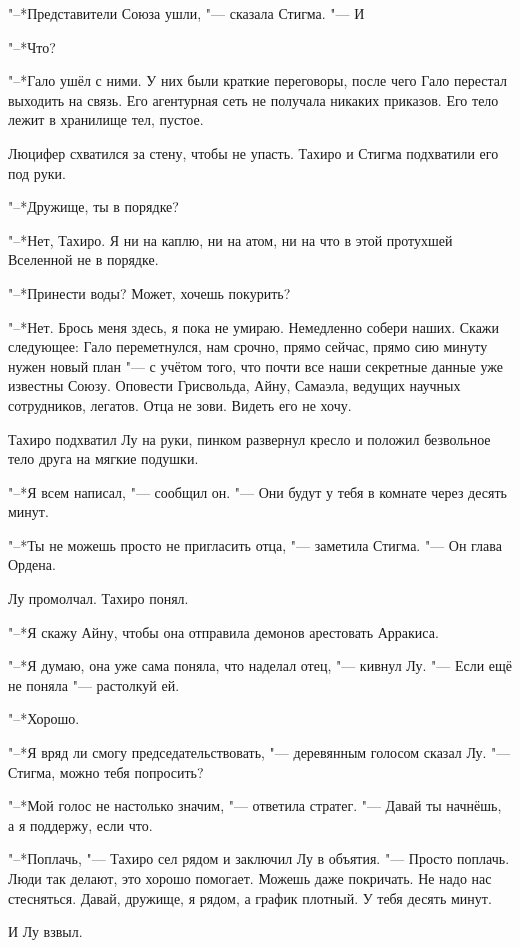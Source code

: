 \spacing

"--*Представители Союза ушли, "--- сказала Стигма.
"--- И\ldotst

"--*Что?

"--*Гало ушёл с ними.
У них были краткие переговоры, после чего Гало перестал выходить на связь.
Его агентурная сеть не получала никаких приказов.
Его тело лежит в хранилище тел, пустое.

Люцифер схватился за стену, чтобы не упасть.
Тахиро и Стигма подхватили его под руки.

"--*Дружище, ты в порядке?

"--*Нет, Тахиро.
Я ни на каплю, ни на атом, ни на что в этой протухшей Вселенной не в порядке.

"--*Принести воды?
Может, хочешь покурить?

"--*Нет.
Брось меня здесь, я пока не умираю.
Немедленно собери наших.
Скажи следующее: Гало переметнулся, нам срочно, прямо сейчас, прямо сию минуту нужен новый план "--- с учётом того, что почти все наши секретные данные уже известны Союзу.
Оповести Грисвольда, Айну, Самаэла, ведущих научных сотрудников, легатов.
Отца не зови.
Видеть его не хочу.

Тахиро подхватил Лу на руки, пинком развернул кресло и положил безвольное тело друга на мягкие подушки.

"--*Я всем написал, "--- сообщил он.
"--- Они будут у тебя в комнате через десять минут.

"--*Ты не можешь просто не пригласить отца, "--- заметила Стигма.
"--- Он глава Ордена.

Лу промолчал.
Тахиро понял.

"--*Я скажу Айну, чтобы она отправила демонов арестовать Арракиса.

"--*Я думаю, она уже сама поняла, что наделал отец, "--- кивнул Лу.
"--- Если ещё не поняла "--- растолкуй ей.

"--*Хорошо.

"--*Я вряд ли смогу председательствовать, "--- деревянным голосом сказал Лу.
"--- Стигма, можно тебя попросить?

"--*Мой голос не настолько значим, "--- ответила стратег.
"--- Давай ты начнёшь, а я поддержу, если что.

"--*Поплачь, "--- Тахиро сел рядом и заключил Лу в объятия.
"--- Просто поплачь.
Люди так делают, это хорошо помогает.
Можешь даже покричать.
Не надо нас стесняться.
Давай, дружище, я рядом, а график плотный.
У тебя десять минут.

И Лу взвыл.

